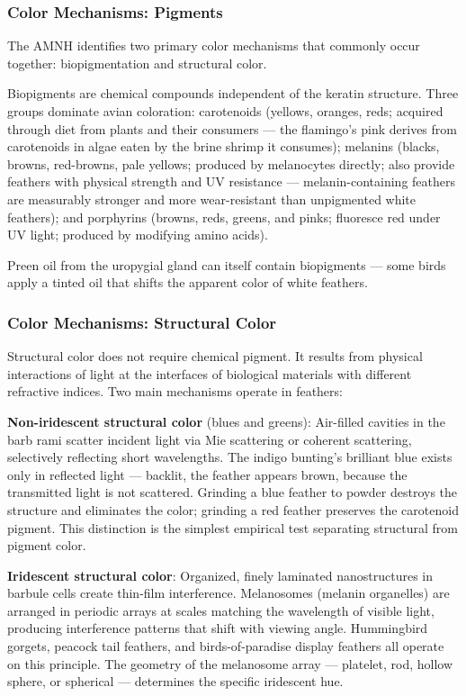 \documentclass[11pt,letterpaper]{article}
\begin{document}
\subsubsection{Color Mechanisms: Pigments}

The AMNH identifies two primary color mechanisms that commonly occur together: biopigmentation and structural color.

Biopigments are chemical compounds independent of the keratin structure. Three groups dominate avian coloration: carotenoids (yellows, oranges, reds; acquired through diet from plants and their consumers --- the flamingo's pink derives from carotenoids in algae eaten by the brine shrimp it consumes); melanins (blacks, browns, red-browns, pale yellows; produced by melanocytes directly; also provide feathers with physical strength and UV resistance --- melanin-containing feathers are measurably stronger and more wear-resistant than unpigmented white feathers); and porphyrins (browns, reds, greens, and pinks; fluoresce red under UV light; produced by modifying amino acids).

Preen oil from the uropygial gland can itself contain biopigments --- some birds apply a tinted oil that shifts the apparent color of white feathers.

\subsubsection{Color Mechanisms: Structural Color}

Structural color does not require chemical pigment. It results from physical interactions of light at the interfaces of biological materials with different refractive indices. Two main mechanisms operate in feathers:

\textbf{Non-iridescent structural color} (blues and greens): Air-filled cavities in the barb rami scatter incident light via Mie scattering or coherent scattering, selectively reflecting short wavelengths. The indigo bunting's brilliant blue exists only in reflected light --- backlit, the feather appears brown, because the transmitted light is not scattered. Grinding a blue feather to powder destroys the structure and eliminates the color; grinding a red feather preserves the carotenoid pigment. This distinction is the simplest empirical test separating structural from pigment color.

\textbf{Iridescent structural color}: Organized, finely laminated nanostructures in barbule cells create thin-film interference. Melanosomes (melanin organelles) are arranged in periodic arrays at scales matching the wavelength of visible light, producing interference patterns that shift with viewing angle. Hummingbird gorgets, peacock tail feathers, and birds-of-paradise display feathers all operate on this principle. The geometry of the melanosome array --- platelet, rod, hollow sphere, or spherical --- determines the specific iridescent hue.
\end{document}
